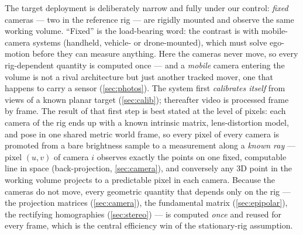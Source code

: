 \documentclass[11pt]{article}
\theoremstyle{definition}
\begin{document}
The target deployment is deliberately narrow and fully under our control:
\emph{fixed} cameras --- two in the reference rig --- are rigidly mounted
and observe the same working volume. ``Fixed'' is the load-bearing word:
the contrast is with mobile-camera systems (handheld, vehicle- or
drone-mounted), which must solve ego-motion before they can measure
anything. Here the cameras never move, so every rig-dependent quantity is
computed once --- and a \emph{mobile} camera entering the volume is not a
rival architecture but just another tracked mover, one that happens to
carry a sensor (\autoref{sec:photos}). The system
first \emph{calibrates itself} from views of a known planar target
(\autoref{sec:calib}); thereafter video is processed frame by frame. The
result of that first step is best stated at the level of pixels: each
camera of the rig ends up with a known intrinsic matrix, lens-distortion
model, and pose in one shared metric world frame, so every pixel of every
camera is promoted from a bare brightness sample to a measurement along a
\emph{known ray} --- pixel $(u,v)$ of camera $i$ observes exactly the
points on one fixed, computable line in space (back-projection,
\autoref{sec:camera}), and conversely any 3D point in the working volume
projects to a predictable pixel in each camera. Because
the cameras do not move, every geometric quantity that depends only on the
rig --- the projection matrices (\autoref{sec:camera}), the fundamental
matrix (\autoref{sec:epipolar}), the rectifying homographies
(\autoref{sec:stereo}) --- is computed \emph{once} and reused for every
frame, which is
the central efficiency win of the stationary-rig assumption.
\end{document}
